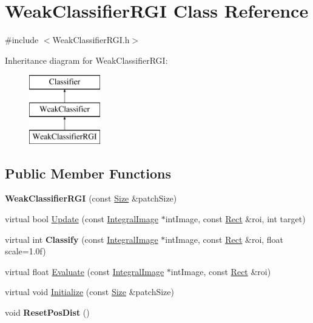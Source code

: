 \hypertarget{classWeakClassifierRGI}{}\section{Weak\+Classifier\+R\+G\+I Class Reference}
\label{classWeakClassifierRGI}


{\ttfamily \#include $<$Weak\+Classifier\+R\+G\+I.\+h$>$}

Inheritance diagram for Weak\+Classifier\+R\+G\+I\+:\begin{figure}[H]
\begin{center}
\leavevmode
\includegraphics[height=3.000000cm]{classWeakClassifierRGI}
\end{center}
\end{figure}
\subsection*{Public Member Functions}
\begin{DoxyCompactItemize}
\item 
\hypertarget{classWeakClassifierRGI_abbd6a27d77c3f38bcf2dce39d7571cf7}{}{\bfseries Weak\+Classifier\+R\+G\+I} (const \hyperlink{classSize}{Size} \&patch\+Size)\label{classWeakClassifierRGI_abbd6a27d77c3f38bcf2dce39d7571cf7}

\item 
virtual bool \hyperlink{classWeakClassifierRGI_ab4719f5dcf7acf6e79beb4d246addaa5}{Update} (const \hyperlink{classIntegralImage}{Integral\+Image} $\ast$int\+Image, const \hyperlink{classRect}{Rect} \&roi, int target)
\item 
\hypertarget{classWeakClassifierRGI_a026ab7a9f1c19ced68746121aacd6374}{}virtual int {\bfseries Classify} (const \hyperlink{classIntegralImage}{Integral\+Image} $\ast$int\+Image, const \hyperlink{classRect}{Rect} \&roi, float scale=1.\+0f)\label{classWeakClassifierRGI_a026ab7a9f1c19ced68746121aacd6374}

\item 
virtual float \hyperlink{classWeakClassifierRGI_aaff18f2962e93ad64eb7b4c6e127b91c}{Evaluate} (const \hyperlink{classIntegralImage}{Integral\+Image} $\ast$int\+Image, const \hyperlink{classRect}{Rect} \&roi)
\item 
virtual void \hyperlink{classWeakClassifierRGI_af3d14f1749fa8543ac6f3e52af2cf607}{Initialize} (const \hyperlink{classSize}{Size} \&patch\+Size)
\item 
\hypertarget{classWeakClassifierRGI_aa48904ae41002320da3e5563aaf1ca60}{}void {\bfseries Reset\+Pos\+Dist} ()\label{classWeakClassifierRGI_aa48904ae41002320da3e5563aaf1ca60}

\end{DoxyCompactItemize}


